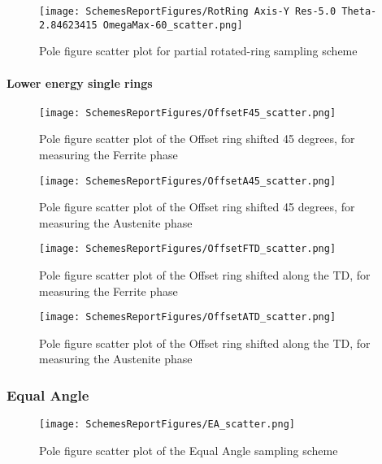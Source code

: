 \documentclass{article}
\begin{document}
\begin{figure}[ht]
    \centering
    \texttt{[image: SchemesReportFigures/RotRing Axis-Y Res-5.0 Theta-2.84623415 OmegaMax-60\_scatter.png]}
    \caption{Pole figure scatter plot for partial rotated-ring sampling scheme}
\end{figure}

\paragraph{Lower energy single rings}

\begin{figure}[ht]
    \centering
    \texttt{[image: SchemesReportFigures/OffsetF45\_scatter.png]}
    \caption{Pole figure scatter plot of the Offset ring shifted 45 degrees, for measuring the Ferrite phase}
\end{figure}

\begin{figure}[ht]
    \centering
    \texttt{[image: SchemesReportFigures/OffsetA45\_scatter.png]}
    \caption{Pole figure scatter plot of the Offset ring shifted 45 degrees, for measuring the Austenite phase}
\end{figure}

\begin{figure}[ht]
    \centering
    \texttt{[image: SchemesReportFigures/OffsetFTD\_scatter.png]}
    \caption{Pole figure scatter plot of the Offset ring shifted along the TD, for measuring the Ferrite phase}
\end{figure}

\begin{figure}[ht]
    \centering
    \texttt{[image: SchemesReportFigures/OffsetATD\_scatter.png]}
    \caption{Pole figure scatter plot of the Offset ring shifted along the TD, for measuring the Austenite phase}
\end{figure}


\subsubsection{Equal Angle}



\begin{figure}[ht]
    \centering
    \texttt{[image: SchemesReportFigures/EA\_scatter.png]}
    \caption{Pole figure scatter plot of the Equal Angle sampling scheme}
\end{figure}
\end{document}

